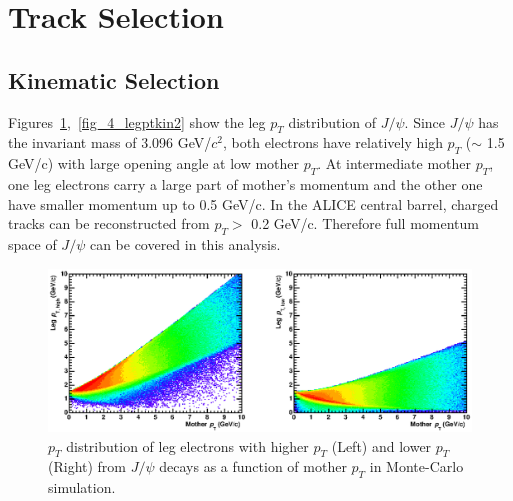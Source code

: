 
\section{Track Selection}
\label{sec_4_trackrec}
\subsection{Kinematic Selection}
Figures~\ref{fig_4_legptkin},~\ref{fig_4_legptkin2} show the leg $p_{T}$ distribution of $J/\psi$.
Since $J/\psi$ has the invariant mass of 3.096 GeV/$c^{2}$, both electrons have relatively high $p_{T}$ ($\sim$ 1.5 GeV/c) with large opening angle at low mother $p_{T}$.  
At intermediate mother $p_{T}$, one leg electrons carry a large part of mother's momentum and the other one have smaller momentum up to 0.5 GeV/c. 
In the ALICE central barrel, charged tracks can be reconstructed from $p_{T} > $ 0.2 GeV/c. 
Therefore full momentum space of $J/\psi$ can be covered in this analysis. 
\begin{figure}[!h]
  \centering
  \includegraphics[width=16cm]{chap4/figure/Kinematics/Jpsi_mompt_legpt.eps}
  \caption{ $p_{T}$ distribution of leg electrons with higher $p_{T}$ (Left) and lower $p_{T}$ (Right) from $J/\psi$ decays as a function of mother $p_{T}$ in Monte-Carlo simulation. }
  \label{fig_4_legptkin}
\end{figure}

